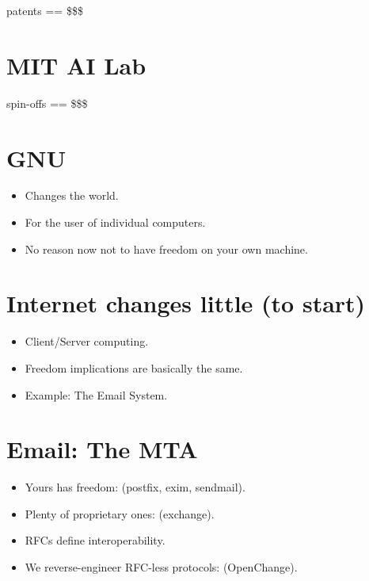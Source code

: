 \documentclass{article}
\begin{document}
patents == \$\$\$

\section{MIT AI Lab}

spin-offs == \$\$\$

\section{GNU}

\begin{itemize}
\item 
  Changes the world.

\item 
  For the user of individual computers.

\item 
  No reason now not to have freedom on your own machine.

\end{itemize}
\section{Internet changes little (to start)}

\begin{itemize}
\item 
  Client/Server computing.

\item 
  Freedom implications are basically the same.

\item 
  Example: The Email System.

\end{itemize}
\section{Email: The MTA}

\begin{itemize}
\item 
  Yours has freedom: (postfix, exim, sendmail).

\item 
  Plenty of proprietary ones: (exchange).

\item 
  RFCs define interoperability.

\item 
  We reverse-engineer RFC-less protocols: (OpenChange).

\end{itemize}
\end{document}
